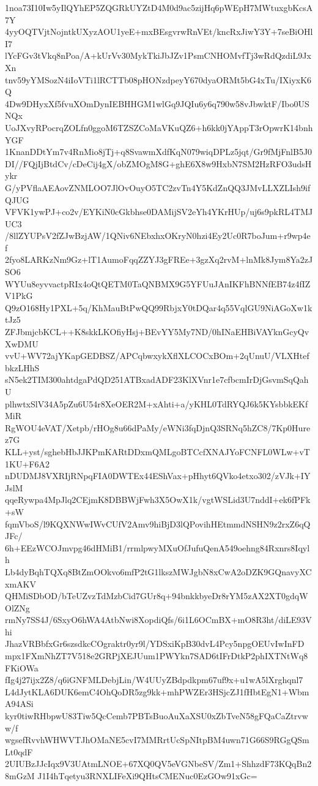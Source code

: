 1noa73I10Iw5yIlQYhEP5ZQGRkUYZtD4M0d9ac5zijHq6pWEpH7MWtuxgbKcsA7Y
4yyOQTVjtNojntkUXyzAOU1yeE+mxBEsgvrwRnVEt/kncRxJiwY3Y+7seBiOHlI7
lYcFGv3tVkq8nPoa/A+kUrVv30MykTkiJbJZv1PsmCNHOMvfTj3wRdQzdiL9JxXn
tnv59yYMSozN4iIoVTi1lRCTTb08pHONzdpeyY670dyaORMt5bG4xTu/IXiyxK6Q
4Dw9DHyxXf5fvuXOmDynIEBHHGM1wlGq9JQIu6y6q790w58vJbwktF/Ibo0USNQx
UoJXvyRPocrqZOLfn0ggoM6TZSZCoMaVKuQZ6+h6kk0jYAppT3rOpwrK14bnhYGF
1KnanDDtYm7v4RnMio8jTj+q8SvawmXdfKqN079wiqDPLz5jqt/Gr9fMjFnlB5J0
DI//FQjIjBtdCv/cDeCij4gX/obZMOgM8G+ghE6X8w9HxbN7SM2HzRFO3udsHykr
G/yPVflaAEAovZNMLOO7JlOvOuyO5TC2zvTn4Y5KdZnQQ3JMvLLXZLIsh9ifQJUG
VFVK1ywPJ+co2v/EYKiN0cGkbhse0DAMijSV2eYh4YKrHUp/uj6s9pkRL4TMJUC3
/8llZYUPsV2fZJwBzjAW/1QNiv6NEbxhxOKryN0hzi4Ey2Uc0R7boJum+r9wp4ef
2fyo8LARKzNm9Gz+lT1AumoFqqZZYJ3gFREe+3gzXq2rvM+lnMk8Jym8Ya2zJSO6
WYUu8eyvvactpRIx4oQtQETM0TaQNBMX9G5YFUuJAnIKFhBNNfEB74z4fIZV1PkG
Q9zO168Hy1PXL+5q/KhMauBtPwQQ99RbjxY0tDQar4q55VqlGU9NiAGoXw1ktJz5
ZFJbmjcbKCL++K8skkLKOfiyHsj+BEvYY5My7ND/0hINaEHBiVAYknGcyQvXwDMU
vvU+WV72ajYKapGEDBSZ/APCqbwxykXflXLCOCxBOm+2qUnuU/VLXHtefbkzLHhS
sN5ek2TIM300ahtdgaPdQD251ATBxadADF23KlXVnr1e7cfbcmIrDjGsvmSqQahU
plhwtxSlV34A5pZu6U54r8XeOER2M+xAhti+a/yKHL0TdRYQJ6k5KYsbbkEKfMiR
RgWOU4eVAT/Xetpb/rHOg8u66dPaMy/eWNi3fqDjnQ3SRNq5hZC8/7Kp0Hurez7G
KLL+yst/sghebHbJJKPmKARtDDxmQMLgoBTCcfXNAJYoFCNFL0WLw+vT1KU+F6A2
nDUDMJ8VXRIjRNpqFIA0DWTEx44EShVax+pHhyt6QVko4etxo302/zVJk+IYJslM
qqeRywpa4MpJlq2CEjmK8DBBWjFwh3X5OwX1k/vgtWSLid3U7nddI+ek6fPFk+sW
fqmVboS/l9KQXNWwIWvCUfV2Amv9hiBjD3lQPovihHEtmmdNSHN9z2rxZ6qQJFc/
6h+EEzWCOJmvpg46dHMiB1/rrmlpwyMXuOfJufuQenA549oehng84Rxnrs8Iqylh
Lb4dyBqhTQXq8BtZmOOkvo6mfP2tG1lkszMWJgbN8xCwA2oDZK9GQnavyXCxmAKV
QHMiSDbOD/bTeUZvzTdMzbCid7GUr8q+94bnkkbyeDr8rYM5zAX2XT0gdqWOlZNg
rmNy7SS4J/6SxyO6hWA4AtbNwi8XopdiQfs/6i1L6OCmBX+mO8R3ht/diLE93Vhi
JhazVRBbfxGr6szsdkcCOgraktr0yr9l/YDSxiKpB30dvL4Pcy5npgOEUvIwInFD
mpx1FXmNhZT7V518e2GRPjXEJUum1PWYkn7SAD6tIFrDtkP2phIXTNtWq8FKiOWa
fIg4j27ijx2Z8/q6iGNFMLDebjLin/W4UUyZBdpdkpm67uf9x+u1wA5lXrghqnl7
L4dJytKLA6DUK6emC4OhQoDR5zg9kk+mhPWZEr3HSjcZJ1fHbtEgN1+WbmA94ASi
kyr0tiwRHbpwU83Tiw5QcCemb7PBTsBuoAuXaXSU0xZbTveN58gFQaCaZtrvww/f
wgsefRvvhWHWVTJhOMaNE5cvI7MMRrtUcSpNItpBM4uwn71G66S9RGgQSmLt0qdF
2UIUBzJJcIqx9V3UAtmLNOE+67XQ0QV5eVGNbeSV/Zm1+ShhzdF73KQqBn28mGzM
J1I4hTqetyu3RNXLIFeXi9QHtsCMENuc0EzGOw91xGc=

